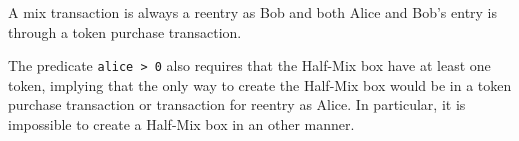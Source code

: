 \documentclass[runningheads]{llncs}
\begin{document}
A mix transaction is always a reentry as Bob and both Alice and Bob's entry is through a token purchase transaction. 

The predicate \texttt{alice > 0} also requires that the Half-Mix box have at least one token, implying that the only way to create the Half-Mix box would be in a token purchase transaction or transaction for reentry as Alice. In particular, it is impossible to create a Half-Mix box in an other manner.



\end{document}
